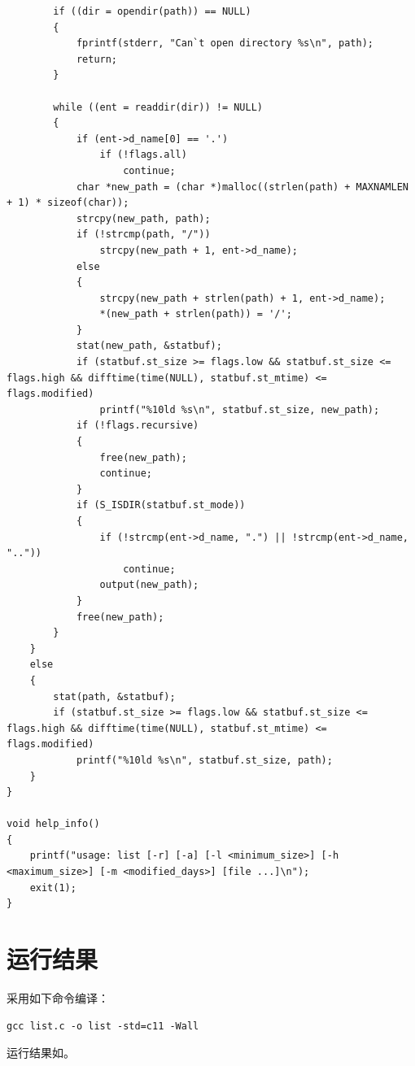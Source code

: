 \documentclass[lang=cn,11pt,a4paper,cite=authornum]{paper}
\begin{document}
\begin{code}
\begin{verbatim}
        if ((dir = opendir(path)) == NULL)
        {
            fprintf(stderr, "Can`t open directory %s\n", path);
            return;
        }

        while ((ent = readdir(dir)) != NULL)
        {
            if (ent->d_name[0] == '.')
                if (!flags.all)
                    continue;
            char *new_path = (char *)malloc((strlen(path) + MAXNAMLEN + 1) * sizeof(char));
            strcpy(new_path, path);
            if (!strcmp(path, "/"))
                strcpy(new_path + 1, ent->d_name);
            else
            {
                strcpy(new_path + strlen(path) + 1, ent->d_name);
                *(new_path + strlen(path)) = '/';
            }
            stat(new_path, &statbuf);
            if (statbuf.st_size >= flags.low && statbuf.st_size <= flags.high && difftime(time(NULL), statbuf.st_mtime) <= flags.modified)
                printf("%10ld %s\n", statbuf.st_size, new_path);
            if (!flags.recursive)
            {
                free(new_path);
                continue;
            }
            if (S_ISDIR(statbuf.st_mode))
            {
                if (!strcmp(ent->d_name, ".") || !strcmp(ent->d_name, ".."))
                    continue;
                output(new_path);
            }
            free(new_path);
        }
    }
    else
    {
        stat(path, &statbuf);
        if (statbuf.st_size >= flags.low && statbuf.st_size <= flags.high && difftime(time(NULL), statbuf.st_mtime) <= flags.modified)
            printf("%10ld %s\n", statbuf.st_size, path);
    }
}

void help_info()
{
    printf("usage: list [-r] [-a] [-l <minimum_size>] [-h <maximum_size>] [-m <modified_days>] [file ...]\n");
    exit(1);
}
\end{verbatim}
\end{code}

\section{运行结果}

采用如下命令编译：

\begin{code}
    \begin{verbatim}
gcc list.c -o list -std=c11 -Wall
\end{verbatim}
\end{code}

运行结果如。
\end{document}
